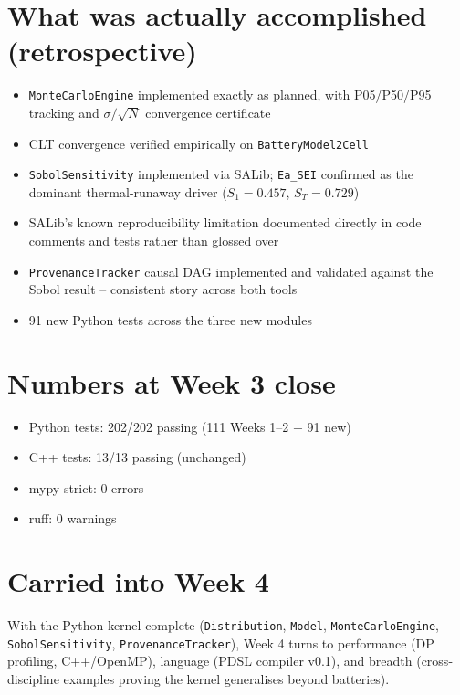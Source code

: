 \documentclass[11pt]{article}
\begin{document}
\section*{What was actually accomplished (retrospective)}

\begin{itemize}[leftmargin=*]
  \item \texttt{MonteCarloEngine} implemented exactly as planned, with
    P05/P50/P95 tracking and $\sigma/\sqrt{N}$ convergence certificate
  \item CLT convergence verified empirically on
    \texttt{BatteryModel2Cell}
  \item \texttt{SobolSensitivity} implemented via SALib; \texttt{Ea\_SEI}
    confirmed as the dominant thermal-runaway driver
    ($S_1 = 0.457$, $S_T = 0.729$)
  \item SALib's known reproducibility limitation documented directly in
    code comments and tests rather than glossed over
  \item \texttt{ProvenanceTracker} causal DAG implemented and validated
    against the Sobol result -- consistent story across both tools
  \item 91 new Python tests across the three new modules
\end{itemize}

\section*{Numbers at Week 3 close}
\begin{itemize}[leftmargin=*]
  \item Python tests: 202/202 passing (111 Weeks 1--2 + 91 new)
  \item C++ tests: 13/13 passing (unchanged)
  \item mypy strict: 0 errors
  \item ruff: 0 warnings
\end{itemize}

\section*{Carried into Week 4}
With the Python kernel complete (\texttt{Distribution}, \texttt{Model},
\texttt{MonteCarloEngine}, \texttt{SobolSensitivity},
\texttt{ProvenanceTracker}), Week 4 turns to performance (DP profiling,
C++/OpenMP), language (PDSL compiler v0.1), and breadth
(cross-discipline examples proving the kernel generalises beyond
batteries).
\end{document}
